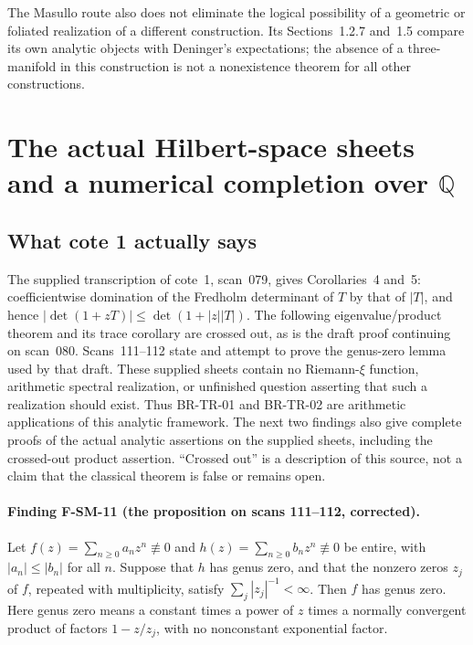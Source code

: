 \documentclass[11pt,a4paper]{article}
\theoremstyle{definition}\newtheorem{definition}[theorem]{Definition}
\theoremstyle{remark}\newtheorem{remark}[theorem]{Remark}
\begin{document}
The Masullo route also does not eliminate the logical possibility of a
geometric or foliated realization of a different construction.  Its
Sections~1.2.7 and~1.5 compare its own analytic objects with Deninger's
expectations; the absence of a three-manifold in this construction is
not a nonexistence theorem for all other constructions.


\section{The actual Hilbert-space sheets and a numerical completion over \texorpdfstring{$\mathbb Q$}{Q}}
\label{sec:masullo-numeric}

\subsection{What cote 1 actually says}

The supplied transcription of cote~1, scan~079, gives Corollaries~4 and~5:
coefficientwise domination of the Fredholm determinant of $T$ by that of
$|T|$, and hence $|\det(1+zT)|\leq\det(1+|z||T|)$.  The following
eigenvalue/product theorem and its trace corollary are crossed out, as is the
draft proof continuing on scan~080.  Scans~111--112 state and attempt to prove
the genus-zero lemma used by that draft.  These supplied sheets contain no
Riemann-$\xi$ function, arithmetic spectral realization, or unfinished question
asserting that such a realization should exist.  Thus BR-TR-01 and BR-TR-02
are arithmetic applications of this analytic framework.  The next two
findings also give complete proofs of the actual analytic assertions on the
supplied sheets, including the crossed-out product assertion.  ``Crossed
out'' is a description of this source, not a claim that the classical theorem
is false or remains open.

\paragraph{Finding F-SM-11 (the proposition on scans 111--112, corrected).}
Let $f(z)=\sum_{n\geq0}a_nz^n\not\equiv0$ and
$h(z)=\sum_{n\geq0}b_nz^n\not\equiv0$ be entire, with
$|a_n|\leq|b_n|$ for all $n$.  Suppose that $h$ has genus zero, and that the
nonzero zeros $z_j$ of $f$, repeated with multiplicity, satisfy
$\sum_j|z_j|^{-1}<\infty$.  Then $f$ has genus zero.  Here genus zero means
a constant times a power of $z$ times a normally convergent product of
factors $1-z/z_j$, with no nonconstant exponential factor.
\end{document}
